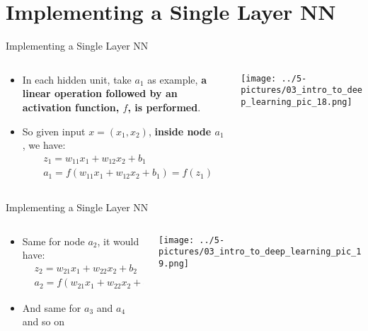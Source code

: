\documentclass[11pt]{beamer}
\begin{document}
\section{Implementing a Single Layer NN}
\begin{frame}{Implementing a Single Layer NN}
\begin{columns}[T] %
\begin{column}{.48\textwidth}
\begin{itemize}
\item In each hidden unit, take $a_1$ as example, \textbf{a linear operation followed by an activation function, $f$, is performed}. 
\item So given input $x = (x_1, x_2)$, \textbf{inside node $a_1$}, we have:
\begin{align*}
&z_1 = w_{11}x_1 + w_{12}x_2 + b_1 \\
&a_1 = f(w_{11}x_1 + w_{12}x_2 + b_1) = f(z_1) 
\end{align*}
\end{itemize}
\end{column}%
\hfill%
\begin{column}{.48\textwidth}
        \texttt{[image: ../5-pictures/03\_intro\_to\_deep\_learning\_pic\_18.png]}
\end{column}%
\end{columns}
\end{frame}
\begin{frame}{Implementing a Single Layer NN}
\begin{columns}[T] %
\begin{column}{.48\textwidth}
\begin{itemize}
\item Same for node $a_2$, it would have:
\begin{align*}
&z_2 = w_{21}x_1 + w_{22}x_2 + b_2    \\
&a_2  = f(w_{21}x_1 + w_{22}x_2 + b_2) = f(z_2) 
\end{align*}	
\item And same for $a_3$ and $a_4$ and so on

\end{itemize}
\end{column}%
\hfill%
\begin{column}{.48\textwidth}
        \texttt{[image: ../5-pictures/03\_intro\_to\_deep\_learning\_pic\_19.png]}
\end{column}%
\end{columns}
\end{frame}
\end{document}
